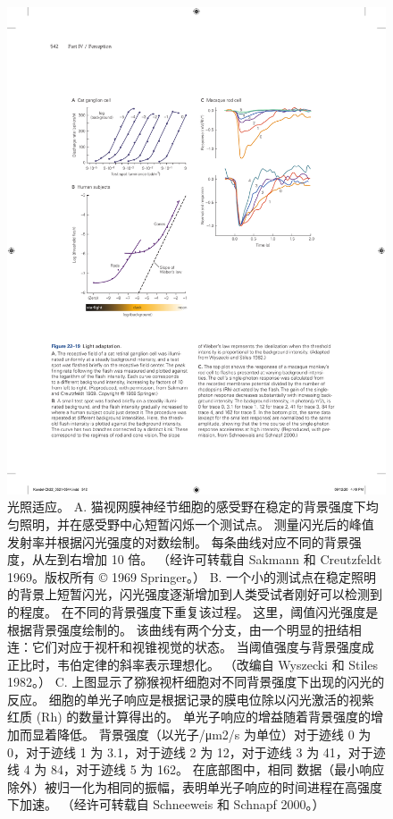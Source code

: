 \begin{figure}[htbp]
	\centering
	\includegraphics[width=1.0\linewidth]{chap22/fig_22_19}
	\caption{光照适应。 
		A. 猫视网膜神经节细胞的感受野在稳定的背景强度下均匀照明，并在感受野中心短暂闪烁一个测试点。 
		测量闪光后的峰值发射率并根据闪光强度的对数绘制。 每条曲线对应不同的背景强度，从左到右增加 10 倍。 （经许可转载自 Sakmann 和 Creutzfeldt 1969。版权所有 © 1969 Springer。） 
		B. 一个小的测试点在稳定照明的背景上短暂闪光，闪光强度逐渐增加到人类受试者刚好可以检测到的程度。 在不同的背景强度下重复该过程。 
		这里，阈值闪光强度是根据背景强度绘制的。 该曲线有两个分支，由一个明显的扭结相连：它们对应于视杆和视锥视觉的状态。 
		当阈值强度与背景强度成正比时，韦伯定律的斜率表示理想化。 （改编自 Wyszecki 和 Stiles 1982。）
		C. 上图显示了猕猴视杆细胞对不同背景强度下出现的闪光的反应。 
		细胞的单光子响应是根据记录的膜电位除以闪光激活的视紫红质 (Rh) 的数量计算得出的。 
		单光子响应的增益随着背景强度的增加而显着降低。 
		背景强度（以光子/μm2/s 为单位）对于迹线 0 为 0，对于迹线 1 为 3.1，对于迹线 2 为 12，对于迹线 3 为 41，对于迹线 4 为 84，对于迹线 5 为 162。
		在底部图中，相同 数据（最小响应除外）被归一化为相同的振幅，表明单光子响应的时间进程在高强度下加速。 （经许可转载自 Schneeweis 和 Schnapf 2000。）}
	\label{fig:22_19}
\end{figure}

